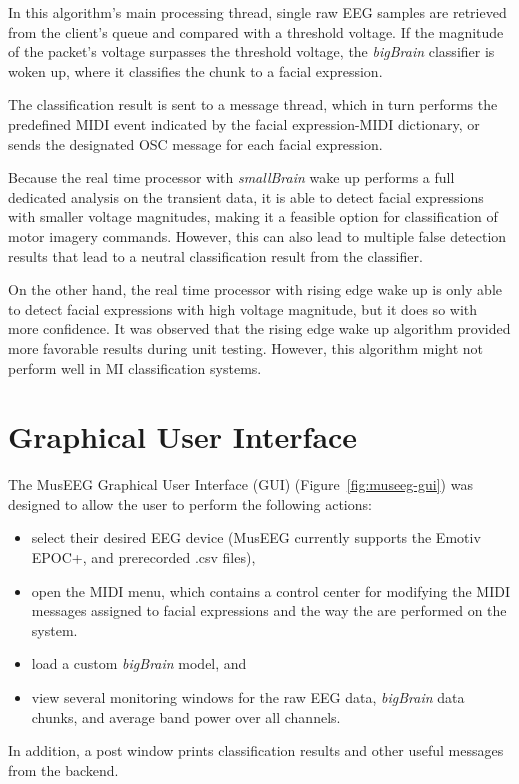 In this algorithm's main processing thread, single raw EEG samples are retrieved from the client's queue and compared with a threshold voltage. If the magnitude of the packet's voltage surpasses the threshold voltage, the \textit{bigBrain} classifier is woken up, where it classifies the chunk to a facial expression. 

The classification result is sent to a message thread, which in turn performs the predefined MIDI event indicated by the facial expression-MIDI dictionary, or sends the designated OSC message for each facial expression.

Because the real time processor with \textit{smallBrain} wake up performs a full dedicated analysis on the transient data, it is able to detect facial expressions with smaller voltage magnitudes, making it a feasible option for classification of motor imagery commands. However, this can also lead to multiple false detection results that lead to a neutral classification result from the  classifier. 

On the other hand, the real time processor with rising edge wake up is only able to detect facial expressions with high voltage magnitude, but it does so with more confidence. It was observed that the rising edge wake up algorithm provided more favorable results during unit testing. However, this algorithm might not perform well in MI classification systems. 
 
\section{Graphical User Interface}

The MusEEG Graphical User Interface (GUI) (Figure~\ref{fig:museeg-gui}) was designed to allow the user to perform the following actions: 
\begin{itemize}
\item select their desired EEG device (MusEEG currently supports the Emotiv EPOC+, and prerecorded .csv files),
\item open the MIDI menu, which contains a control center for modifying the MIDI messages assigned to facial expressions and the way the are performed on the system. 
\item load a custom \textit{bigBrain} model, and
\item view several monitoring windows for the raw EEG data, \textit{bigBrain} data chunks, and average band power over all channels. 
\end{itemize}
In addition, a post window prints classification results and other useful messages from the backend. 

